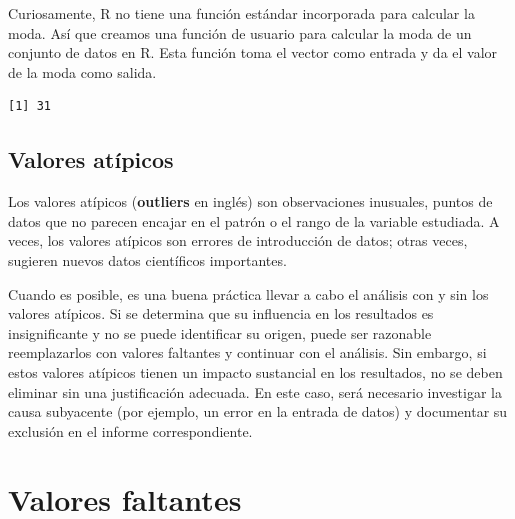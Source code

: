 \documentclass[
  letterpaper,
  DIV=11,
  numbers=noendperiod]{scrreprt}
\newenvironment{Shaded}{\begin{snugshade}}{\end{snugshade}}
\newcommand{\CommentTok}[1]{\textcolor[rgb]{0.37,0.37,0.37}{#1}}
\newcommand{\ControlFlowTok}[1]{\textcolor[rgb]{0.00,0.23,0.31}{#1}}
\newcommand{\FunctionTok}[1]{\textcolor[rgb]{0.28,0.35,0.67}{#1}}
\newcommand{\NormalTok}[1]{\textcolor[rgb]{0.00,0.23,0.31}{#1}}
\newcommand{\OtherTok}[1]{\textcolor[rgb]{0.00,0.23,0.31}{#1}}
\newcommand{\SpecialCharTok}[1]{\textcolor[rgb]{0.37,0.37,0.37}{#1}}
\begin{document}
Curiosamente, R no tiene una función estándar incorporada para calcular
la moda. Así que creamos una función de usuario para calcular la moda de
un conjunto de datos en R. Esta función toma el vector como entrada y da
el valor de la moda como salida.

\begin{Shaded}
\end{Shaded}

\begin{verbatim}
[1] 31
\end{verbatim}

\hypertarget{valores-atuxedpicos}{%
\subsection{Valores atípicos}\label{valores-atuxedpicos}}

Los valores atípicos (\textbf{outliers} en inglés) son observaciones
inusuales, puntos de datos que no parecen encajar en el patrón o el
rango de la variable estudiada. A veces, los valores atípicos son
errores de introducción de datos; otras veces, sugieren nuevos datos
científicos importantes.

Cuando es posible, es una buena práctica llevar a cabo el análisis con y
sin los valores atípicos. Si se determina que su influencia en los
resultados es insignificante y no se puede identificar su origen, puede
ser razonable reemplazarlos con valores faltantes y continuar con el
análisis. Sin embargo, si estos valores atípicos tienen un impacto
sustancial en los resultados, no se deben eliminar sin una justificación
adecuada. En este caso, será necesario investigar la causa subyacente
(por ejemplo, un error en la entrada de datos) y documentar su exclusión
en el informe correspondiente.

\hypertarget{valores-faltantes}{%
\section{Valores faltantes}\label{valores-faltantes}}
\end{document}

